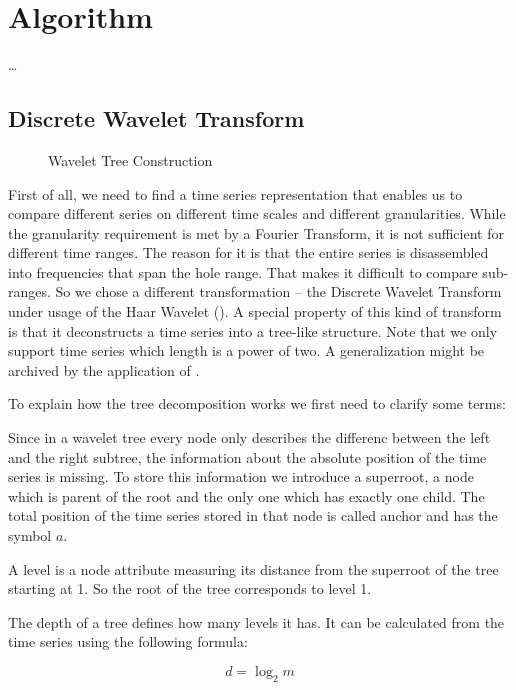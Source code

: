 \chapter{Algorithm}
\label{ch:algorithm}

\dots



\section{Discrete Wavelet Transform}
\label{sec:algorithm:wavelet}

\begin{figure}
    \centering
    
    \caption{Wavelet Tree Construction}
    \label{fig:wavelet_tree_example}
\end{figure}

First of all, we need to find a time series representation that enables us to compare different series on different time scales and different granularities. While the granularity requirement is met by a Fourier Transform, it is not sufficient for different time ranges. The reason for it is that the entire series is disassembled into frequencies that span the hole range. That makes it difficult to compare sub-ranges. So we chose a different transformation -- the Discrete Wavelet Transform under usage of the Haar Wavelet (\cite{Haar}). A special property of this kind of transform is that it deconstructs a time series into a tree-like structure. Note that we only support time series which length is a power of two. A generalization might be archived by the application of \cite{haar_tree_notwo}.

To explain how the tree decomposition works we first need to clarify some terms:

\begin{definition}[Superroot]
    Since in a wavelet tree every node only describes the differenc between the left and the right subtree, the information about the absolute position of the time series is missing. To store this information we introduce a superroot, a node which is parent of the root and the only one which has exactly one child. The total position of the time series stored in that node is called anchor and has the symbol $a$.
\end{definition}

\begin{definition}
    A level is a node attribute measuring its distance from the superroot of the tree starting at \num{1}. So the root of the tree corresponds to level \num{1}.

    The depth of a tree defines how many levels it has. It can be calculated from the time series using the following formula:

    \begin{equation}\label{eq:d}
        d = \log_2 m
    \end{equation}
\end{definition}

